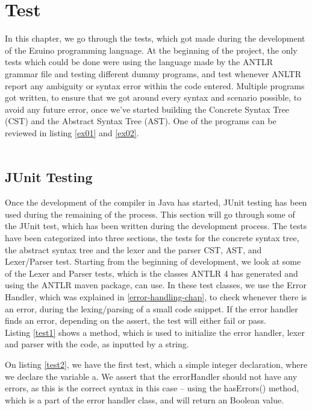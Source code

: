 \chapter{Test}
In this chapter, we go through the tests, which got made during the development of the Ezuino programming language. At the beginning of the project, the only tests which could be done were using the language made by the ANTLR grammar file and testing different dummy programs, and test whenever ANLTR report any ambiguity or syntax error within the code entered. Multiple programs got written, to ensure that we got around every syntax and scenario possible, to avoid any future error, once we’ve started building the Concrete Syntax Tree (CST) and the Abstract Syntax Tree (AST).  One of the programs can be reviewed in listing \ref{ex01} and \ref{ex02}.
\\\\
\section{JUnit Testing}
Once the development of the compiler in Java has started, JUnit testing has been used during the remaining of the process. This section will go through some of the JUnit test, which has been written during the development process. The tests have been categorized into three sections, the tests for the concrete syntax tree, the abstract syntax tree and the lexer and the parser CST, AST, and Lexer/Parser test. 
Starting from the beginning of development, we look at some of the Lexer and Parser tests, which is the classes ANTLR 4 has generated and using the ANTLR maven package, can use. In these test classes, we use the Error Handler, which was explained in \ref{error-handling-chap}, to check whenever there is an error, during the lexing/parsing of a small code snippet. If the error handler finds an error, depending on the assert, the test will either fail or pass.\\
Listing \ref{test1} shows a method, which is used to initialize the error handler, lexer and parser with the code, as inputted by a string. 

\noindent\newline

On listing \ref{test2}, we have the first test, which a simple integer declaration, where we declare the variable a. We assert that the errorHandler should not have any errors, as this is the correct syntax in this case – using the hasErrors() method, which is a part of the error handler class, and will return an Boolean value.

\noindent\newline

